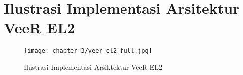 \chapter{Ilustrasi Implementasi Arsitektur VeeR EL2}
\label{appendix:veer-el2-full}

\begin{figure}[h]
	\centering
	\begin{sideways}
		\texttt{[image: chapter-3/veer-el2-full.jpg]}
	\end{sideways}
	\caption{Ilustrasi Implementasi Arsiktektur VeeR EL2 \parencite{chip2024cores}}
	\label{fig:veer-el2-full}
\end{figure}

